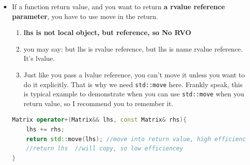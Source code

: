 \documentclass[a4paper,11pt,twoside]{book}
\begin{document}
\begin{itemize}
\item If a function return value, and you want to return \textbf{a rvalue reference parameter}, you have to use move in the return.
\begin{enumerate}
	\item \textbf{lhs is not local object, but reference, so No RVO}
	\item you may say: but lhs is rvalue reference, but lhs is name rvalue reference. It's lvalue.
	
	\item Just like you pass a lvalue reference, you can't move it unless you want to do it explicitly. That is why we need \texttt{std::move} here. Frankly speak, this is typical example to demonstrate when you can use \texttt{std::move} when you return value, so I recommend you to remember it.
\end{enumerate}

\begin{lstlisting}[frame=single, language=c++]
Matrix operator+(Matrix&& lhs, const Matrix& rhs){
	lhs += rhs; 
	return std::move(lhs); //move into return value, high efficiency. 
	//return lhs  //will copy, so low efficiencey
} 	
\end{lstlisting}

\end{itemize}
\end{document}
